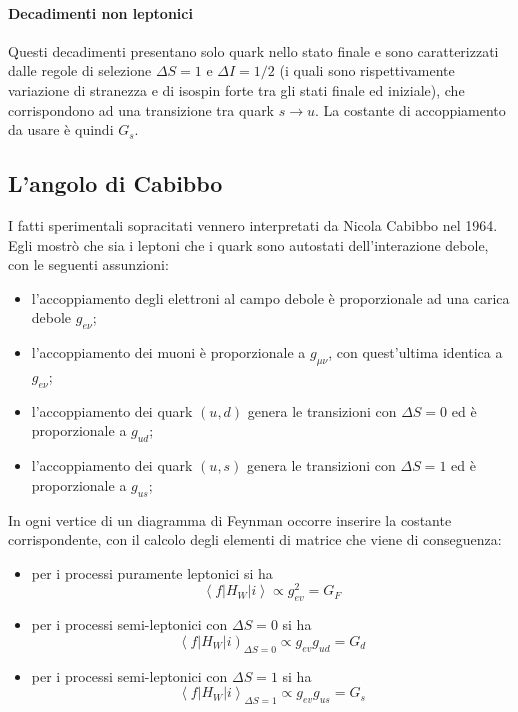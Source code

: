 \documentclass{subnucbo}
\begin{document}
\paragraph{Decadimenti non leptonici}
Questi decadimenti presentano solo quark nello stato finale e sono caratterizzati dalle regole di selezione $\Delta S = 1$ e $\Delta I = 1/2$ (i quali sono rispettivamente variazione di stranezza e di isospin forte tra gli stati finale ed iniziale), che corrispondono ad una transizione tra quark $s \rightarrow u$. La costante di accoppiamento da usare è quindi $G_{s}$.


\subsection{L'angolo di Cabibbo}
I fatti sperimentali sopracitati vennero interpretati da Nicola Cabibbo nel 1964. Egli mostrò che sia i leptoni che i quark sono autostati dell'interazione debole, con le seguenti assunzioni:
\begin{itemize}
        \item l'accoppiamento degli elettroni al campo debole è proporzionale ad una carica debole $g_{e\nu}$;
        \item l'accoppiamento dei muoni è proporzionale a $g_{\mu\nu}$, con quest'ultima identica a $g_{e\nu}$;
        \item l'accoppiamento dei quark $(u, d)$ genera le transizioni con $\Delta S = 0$ ed è proporzionale a $g_{ud}$;
        \item l'accoppiamento dei quark $(u, s)$ genera le transizioni con $\Delta S = 1$ ed è proporzionale a $g_{us}$;
\end{itemize}
In ogni vertice di un diagramma di Feynman occorre inserire la costante corrispondente, con il calcolo degli elementi di matrice che viene di conseguenza:
\begin{itemize}
        \item per i processi puramente leptonici si ha
                \begin{equation}
                        \left\langle f \left| H _ { W } \right| i \right\rangle \propto g _ { e v } ^ { 2 } = G _ { F }
                        \label{eq:genu}
                \end{equation}
        \item per i processi semi-leptonici con $\Delta S = 0$ si ha
                \begin{equation}
                \left\langle f \left| H _ { W } \right| i \right) _ { \Delta S = 0 } \propto g _ { e v } g _ { u d } = G _ { d }
                \label{eq:gd}
        \end{equation}
\item per i processi semi-leptonici con $\Delta S = 1$ si ha
        \begin{equation}
                \left\langle f \left| H _ { W } \right| i \right\rangle _ { \Delta S = 1 } \propto g _ { e v } g _ { u s } = G _ { s }
                \label{eq:gs}
        \end{equation}
\end{itemize}
\end{document}
